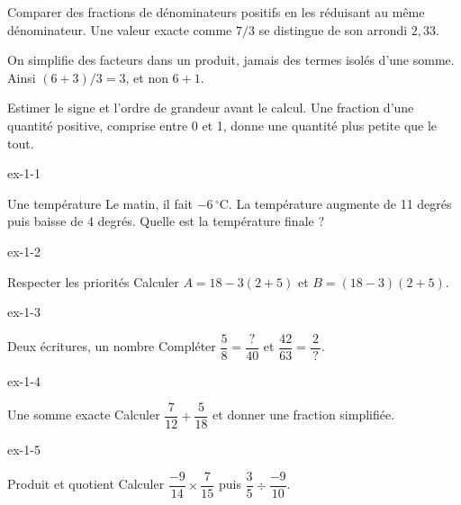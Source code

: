\begin{propriete}Comparer des fractions de dénominateurs positifs en les réduisant au même dénominateur. Une valeur exacte comme $7/3$ se distingue de son arrondi $2{,}33$.\end{propriete}
\begin{attention}On simplifie des facteurs dans un produit, jamais des termes isolés d’une somme. Ainsi $(6+3)/3=3$, et non $6+1$.\end{attention}
Estimer le signe et l’ordre de grandeur avant le calcul. Une fraction d’une quantité positive, comprise entre 0 et 1, donne une quantité plus petite que le tout.
\clearpage{}
\begin{blocLivre}{ex-1-1}\begin{exercice}[1]{Une température}
Le matin, il fait $-6\,^\circ$C. La température augmente de 11 degrés puis baisse de 4 degrés. Quelle est la température finale ?
\end{exercice}\end{blocLivre}
\begin{blocLivre}{ex-1-2}\begin{exercice}[1]{Respecter les priorités}
Calculer $A=18-3(2+5)$ et $B=(18-3)(2+5)$.
\end{exercice}\end{blocLivre}
\begin{blocLivre}{ex-1-3}\begin{exercice}[1]{Deux écritures, un nombre}
Compléter $\dfrac5{8}=\dfrac{\,?\,}{40}$ et $\dfrac{42}{63}=\dfrac2{\,?\,}$.
\end{exercice}\end{blocLivre}
\begin{blocLivre}{ex-1-4}\begin{exercice}[1]{Une somme exacte}
Calculer $\dfrac7{12}+\dfrac5{18}$ et donner une fraction simplifiée.
\end{exercice}\end{blocLivre}
\begin{blocLivre}{ex-1-5}\begin{exercice}[1]{Produit et quotient}
Calculer $\dfrac{-9}{14}\times\dfrac7{15}$ puis $\dfrac35\div\dfrac{-9}{10}$.
\end{exercice}\end{blocLivre}


